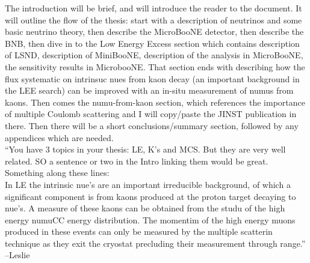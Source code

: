 The introduction will be brief, and will introduce the reader to the document. It will outline the flow of the thesis: start with a description of neutrinos and some basic neutrino theory, then describe the MicroBooNE detector, then describe the BNB, then dive in to the Low Energy Excess section which contains description of LSND, description of MiniBooNE, description of the analysis in MicroBooNE, the sensitivity results in MicrobooNE. That section ends with describing how the flux systematic on intrinsuc nues from kaon decay (an important background in the LEE search) can be improved with an in-situ measurement of numus from kaons. Then comes the numu-from-kaon section, which references the importance of multiple Coulomb scattering and I will copy/paste the JINST publication in there. Then there will be a short conclusions/summary section, followed by any appendices which are needed.\\

``You have 3 topics in your thesis: LE, K’s and MCS. But they are very well related. SO a sentence or two in the Intro linking them would be great. Something along these lines:\\

In LE the intrinsic nue’s are an important irreducible background, of which a significant component is from kaons produced at the proton target decaying to nue’s. A measure of these kaons can be obtained from the studu of the high energy numuCC energy distribution. The momentim of the high energy muons produced in these events can only be measured by the multiple scatterin technique as they exit the cryostat precluding their measurement through range.'' --Leslie